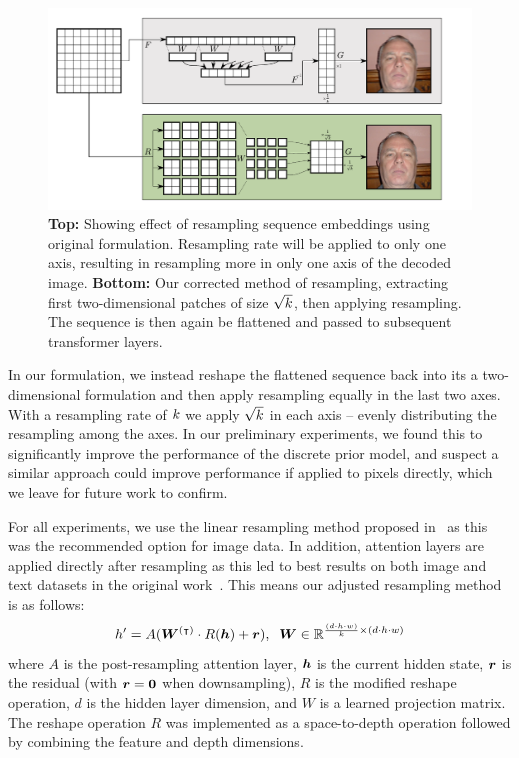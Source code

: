 \begin{figure}[ht!]
    \label{fig:resample}
    \centering
    \includegraphics[width=\textwidth]{figures/resample.pdf}
    \caption{
        \textbf{Top:} Showing effect of resampling sequence embeddings using
        original formulation. Resampling rate will be applied to only one axis,
        resulting in resampling more in only one axis of the decoded image.
        \textbf{Bottom:} Our corrected method of resampling, extracting first
        two-dimensional patches of size $\sqrt{k}$, then applying
        resampling. The sequence is then again be flattened and passed to
        subsequent transformer layers.
    }
\end{figure}

In our formulation, we instead reshape the flattened sequence back into its a
two-dimensional formulation and then apply resampling equally in the last two axes.
With a resampling rate of $k$ we apply $\sqrt{k}$ in
each axis -- evenly distributing the resampling among the axes. In our
preliminary experiments, we found this to significantly improve the performance
of the discrete prior model, and suspect a similar approach could improve
performance if applied to pixels directly, which we leave for future work to
confirm.

For all experiments, we use the linear resampling method proposed
in~\cite{nawrot2021hierarchical} as this was the recommended option for image
data. In addition, attention layers are applied directly after resampling as
this led to best results on both image and text datasets in the original
work~\cite{nawrot2021hierarchical}. This means our adjusted resampling method is
as follows:
\begin{equation}
    h' = A({\bm{W}}^{(\intercal)} \cdot R({\bm{h}}) + {\bm{r}}), \;\; {\bm{W}} \in
    \mathbb{R}^{\frac{(d \cdot h \cdot w)}{k} \times (d \cdot h \cdot w)}
\end{equation}
where $A$ is the post-resampling attention layer, ${\bm{h}}$ is the current hidden
state, ${\bm{r}}$ is the residual (with ${\bm{r}} = \bm{0}$ when downsampling), $R$ is the
modified reshape operation, $d$ is the hidden layer dimension, and $W$ is a
learned projection matrix. The reshape operation $R$ was implemented as a
space-to-depth operation followed by combining the feature and depth dimensions.

